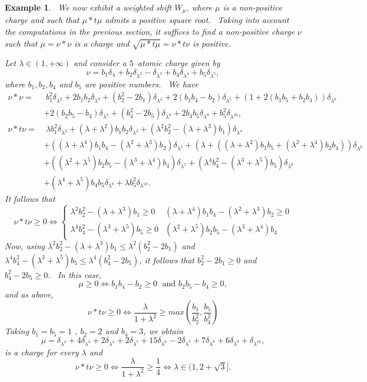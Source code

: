 \documentclass[12pt]{amsart}
\newtheorem{ex}[thm]{Example}
\begin{document}
\begin{ex} \label{ex61} \ We now exhibit a weighted shift $W_\mu$, where $\mu$ is a non-positive charge and such that $\mu*t\mu$ admits a positive square root. \ Taking into account the computations in the previous section, it suffices to find a non-positive charge $\nu$ such that $\mu=\nu*\nu$ is a charge and $ \sqrt{\mu*t\mu}=\nu*t\nu$ is positive. 

Let $\lambda \in (1, +\infty)$  and  consider a $5$--atomic charge given by 
$$
\nu = b_1\delta_{\lambda}+b_2\delta_{\lambda^2} - \delta_{\lambda^3}+b_4\delta_{\lambda^4}+b_5\delta_{\lambda^5},
$$
where $b_1,b_2,b_4$ and $b_5$ are positive numbers. \
 We  have
\begin{align*} \nu*\nu = &\;  b_1^2\delta_{\lambda^2}+ 2b_1b_2\delta_{\lambda^3} +(b_2^2-2b_1)\delta_{\lambda^4} +2(b_1b_4-b_2)\delta_{\lambda^5}+(1+2(b_1b_5+b_2b_4))\delta_{\lambda^6} \\    
& +2(b_2b_5-b_4)\delta_{\lambda^7}+ (b_4^2-2b_5)\delta_{\lambda^8}+ 2b_4b_5\delta_{\lambda^9} +b_{5}^2\delta_{\lambda^{10}}, \\
    \nu*t\nu = & \; \lambda b_1^2\delta_{\lambda^2}+ (\lambda+\lambda^2)b_1b_2\delta_{\lambda^3} +(\lambda^2 b_2^2-(\lambda+\lambda^3)b_1)\delta_{\lambda^4}\\
    &+((\lambda+\lambda^4)b_1b_4-(\lambda^2+\lambda^3)b_2)\delta_{\lambda^5} +(\lambda +((\lambda+\lambda^2)b_1b_5+(\lambda^2+\lambda^4)b_2b_4))\delta_{\lambda^6}  \\
    &+((\lambda^2+\lambda^5)b_2b_5-(\lambda^3+\lambda^4)b_4)\delta_{\lambda^7} +(\lambda^4 b_4^2-(\lambda^3+\lambda^5)b_5)\delta_{\lambda^8} \\ & + (\lambda^4+\lambda^5)b_4b_5\delta_{\lambda^9} +\lambda b_{5}^2\delta_{\lambda^{10}}.
\end{align*} 
It follows that 
$$\nu*t\nu \ge 0 \iff \left\{\begin{array}{cc}
     \lambda^2 b_2^2-(\lambda+\lambda^3)b_1\ge 0  & (\lambda+\lambda^4)b_1b_4-(\lambda^2+\lambda^3)b_2\ge 0 \\
  \lambda^4 b_4^2-(\lambda^3+\lambda^5)b_5 \ge 0   & (\lambda^2+\lambda^5)b_2b_5-(\lambda^3+\lambda^4)b_4
\end{array}\right.$$
Now, using $\lambda^2 b_2^2-(\lambda+\lambda^3)b_1 \le \lambda^2 (b_2^2-2b_1) $ and $\lambda^4 b_4^2-(\lambda^3+\lambda^5)b_5 \le \lambda^4( b_4^2-2b_5)$, it follows that $b_2^2-2b_1\ge 0 $ and $b_4^2-2b_5\ge 0$. \ In this case,  $$\mu \ge 0 \iff b_1b_4-b_2 \ge 0 \; \mbox{ and } b_2b_5-b_4\ge 0  , $$
and as above, 
$$ 
  \nu*t\nu \ge 0 \iff    \frac{\lambda}{1+\lambda^2}\ge max(\frac{b_1}{b_2^2},\frac{b_5}{b_4^2})
 $$
Taking $b_1=b_5=1$ , $b_2=2$ and $  b_4=3$, we obtain 
$$
\mu= \delta_{\lambda^2}+ 4\delta_{\lambda^3} +2\delta_{\lambda^4} +2\delta_{\lambda^5}+15\delta_{\lambda^6}  -2\delta_{\lambda^7}+ 7\delta_{\lambda^8}+ 6\delta_{\lambda^9} +\delta_{\lambda^{10}},
$$
is a charge for every $\lambda$ and $$
\nu*t\nu \ge 0 \iff \frac{\lambda}{1+\lambda^2} \ge \frac{1}{4} \iff \lambda \in (1, 2+\sqrt{3}].
$$
\end{ex}
\end{document}
